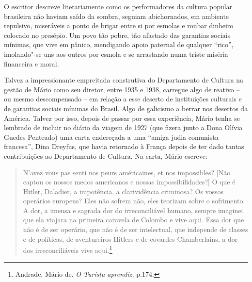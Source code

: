 O escritor descreve literariamente como os performadores da cultura
popular brasileira não haviam saído da sombra, seguiam abichornados, em
ambiente repulsivo, miseráveis a ponto de brigar entre si por esmolas e
roubar dinheiro colocado no presépio. Um povo tão pobre, tão afastado
das garantias sociais mínimas, que vive em pânico, mendigando apoio
paternal de qualquer ``rico'', imolando"-se uns aos outros por esmola e
se arrastando numa triste miséria financeira e moral.

Talvez a impressionante empreitada construtiva do Departamento de
Cultura na gestão de Mário como seu diretor, entre 1935 e 1938, carregue
algo de reativo -- ou mesmo descompensado -- em relação a esse deserto
de instituições culturais e de garantias sociais mínimas do Brasil. Algo
de galicismo a berrar nos desertos da América. Talvez por isso, depois
de passar por essa experiência, Mário tenha se lembrado de incluir no
diário da viagem de 1927 (que fizera junto a Dona Olívia Guedes
Penteado) uma carta endereçada a uma ``amiga judia comunista francesa'',
Dina Dreyfus, que havia retornado à França depois de ter dado tantas
contribuições ao Departamento de Cultura. Na carta, Mário escreve:

\begin{quote}
N'avez vous pas senti nos peurs américaines, et nos impossibles? {[}Não
captou os nossos medos americanos e nossas impossibilidades?{]} O que é
Hitler, Daladier, a impotência, a clarividência criminosa? Os vossos
operários europeus? Eles não sofrem não, eles teorizam sobre o
sofrimento. A dor, a imensa e sagrada dor do irreconciliável humano,
sempre imaginei que ela viajara na primeira caravela de Colombo e vive
aqui. Essa dor que não é de ser operário, que não é de ser intelectual,
que independe de classes e de políticas, de aventureiros Hitlers e de
covardes Chamberlains, a dor dos irreconciliáveis vive aqui.\footnote{Andrade,
  Mário de. \emph{O Turista aprendiz,} p.174.}
\end{quote}

